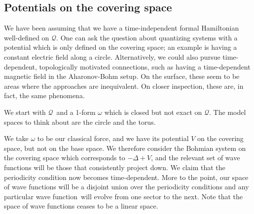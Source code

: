 \documentclass[11pt]{article}
\theoremstyle{remark}
\begin{document}
\subsection{Potentials on the covering space} \label{s:pers}


We have been assuming that we have a
time-independent formal Hamiltonian well-defined on \ensuremath{\mathcal{Q}}. One can
ask the question about quantizing systems with a potential which is
only defined on the covering space; an example is having a constant
electric field along a circle. Alternatively, we could also
 pursue time-dependent, topologically motivated 
connections, such as having a time-dependent magnetic field in the
Aharonov-Bohm setup. On the surface, these seem to be areas where the
approaches are inequivalent. On closer inspection, these are, in fact,
the same phenomena. 


We start with \ensuremath{\mathcal{Q}}\ and a 1-form $\omega$ which is closed but not
exact on \ensuremath{\mathcal{Q}}. 
The model spaces to think about are 
the circle and the torus. 

We take $\omega$ to be our classical force, and we
have its potential $V$ on the covering space, but not on the base
space.  We therefore consider the Bohmian system on the covering space
which corresponds to $-\ensuremath{\Delta} +V$, and the relevant set of wave functions will be
those that consistently project down. We claim that the periodicity
condition now becomes time-dependent. More to the point, our space of
wave functions will be a disjoint union over the periodicity conditions and any
particular wave function\ will evolve from one sector to the next. Note that the
space of  wave functions  ceases to be a linear space. 
\end{document}
